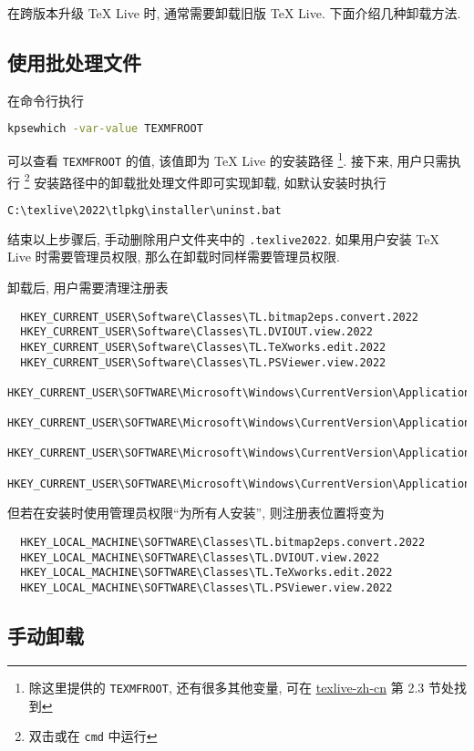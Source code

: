 在跨版本升级 \TeX{} Live 时, 通常需要卸载旧版 \TeX{} Live.
下面介绍几种卸载方法.

\subsection{使用批处理文件}

在命令行执行
\begin{lstlisting}[language=bash]
  kpsewhich -var-value TEXMFROOT
\end{lstlisting}
可以查看 \texttt{TEXMFROOT} 的值,
该值即为 \TeX{} Live 的安装路径%
\footnote{%
  除这里提供的 \texttt{TEXMFROOT}, 还有很多其他变量, 可在
  \href{https://www.tug.org/texlive/doc/texlive-zh-cn/texlive-zh-cn.pdf}{texlive-zh-cn}
  第 2.3 节处找到
}. 
接下来,
用户只需执行%
\footnote{双击或在 \texttt{cmd} 中运行}%
安装路径中的卸载批处理文件即可实现卸载, 如默认安装时执行
\begin{lstlisting}[language=bash]
  C:\texlive\2022\tlpkg\installer\uninst.bat
\end{lstlisting}
结束以上步骤后,
手动删除用户文件夹中的 \texttt{.texlive2022}.
如果用户安装 \TeX{} Live 时需要管理员权限,
那么在卸载时同样需要管理员权限.

卸载后,
用户需要清理注册表
\begin{lstlisting}
  HKEY_CURRENT_USER\Software\Classes\TL.bitmap2eps.convert.2022
  HKEY_CURRENT_USER\Software\Classes\TL.DVIOUT.view.2022
  HKEY_CURRENT_USER\Software\Classes\TL.TeXworks.edit.2022
  HKEY_CURRENT_USER\Software\Classes\TL.PSViewer.view.2022
  HKEY_CURRENT_USER\SOFTWARE\Microsoft\Windows\CurrentVersion\ApplicationAssociationToasts\TL.bitmap2eps.convert.2022_.jpg
  HKEY_CURRENT_USER\SOFTWARE\Microsoft\Windows\CurrentVersion\ApplicationAssociationToasts\TL.bitmap2eps.convert.2022_.png
  HKEY_CURRENT_USER\SOFTWARE\Microsoft\Windows\CurrentVersion\ApplicationAssociationToasts\TL.TeXworks.edit.2022_.sty
  HKEY_CURRENT_USER\SOFTWARE\Microsoft\Windows\CurrentVersion\ApplicationAssociationToasts\TL.TeXworks.edit.2022_.tex
\end{lstlisting}
但若在安装时使用管理员权限``为所有人安装'',
则注册表位置将变为
\begin{lstlisting}
  HKEY_LOCAL_MACHINE\SOFTWARE\Classes\TL.bitmap2eps.convert.2022
  HKEY_LOCAL_MACHINE\SOFTWARE\Classes\TL.DVIOUT.view.2022
  HKEY_LOCAL_MACHINE\SOFTWARE\Classes\TL.TeXworks.edit.2022
  HKEY_LOCAL_MACHINE\SOFTWARE\Classes\TL.PSViewer.view.2022
\end{lstlisting}

\subsection{手动卸载}

